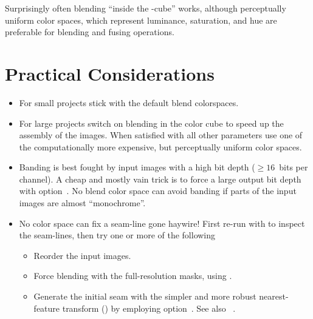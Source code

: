 \noindent Surprisingly often blending ``inside the -cube'' works, although
perceptually uniform color spaces, which represent luminance, saturation, and hue are preferable
for blending and fusing operations.


\section[Practical Considerations]{\label{sec:practical-considerations}%
  Practical Considerations}

\begin{itemize}
\item
  For small projects stick with the default blend colorspaces.

\item
  For large projects switch on blending in the  color cube to speed up the assembly
  of the images.  When satisfied with all other parameters use one of the computationally more
  expensive, but perceptually uniform color spaces.

\item
  Banding is best fought by input images with a high bit depth (\mbox{$\geq 16$ bits} per
  channel).  A cheap and mostly vain trick is to force a large output bit depth with
  option~.  No blend color space can avoid banding if
  parts of the input images are almost ``monochrome''.

\ifenblend
  \item
     No color space can fix a seam-line gone
    haywire!  First re-run  with
     to inspect the seam-lines, then try one
    or more of the following

    \begin{itemize}
    \item
      Reorder the input images.

    \item
      Force blending with the full-resolution masks, using
      .

    \item
      Generate the initial seam with the simpler and more robust nearest-feature transform
      () by employing option~.  See also
      \chapterName~.


\end{itemize}
\end{itemize}
